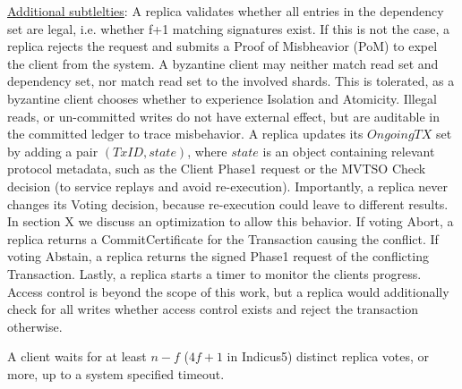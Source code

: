 \underline{Additional subtlelties}: A replica validates whether all entries in the dependency set are legal, i.e. whether f+1 matching signatures exist. If this is not the case, a replica rejects the request and submits a Proof of Misbheavior (PoM) to expel the client from the system. A byzantine client may neither match read set and dependency set, nor match read set to the involved shards. This is tolerated, as a byzantine client chooses whether to experience Isolation and Atomicity. Illegal reads, or un-committed writes do not have external effect, but are auditable in the committed ledger to trace misbehavior.
A replica updates its $OngoingTX$ set by adding a pair $(TxID, state)$, where $state$ is an object containing relevant protocol metadata, such as the Client Phase1 request or the MVTSO Check decision (to service replays and avoid re-execution). Importantly, a replica never changes its Voting decision, because re-execution could leave to different results. In section X we discuss an optimization to allow this behavior. If voting Abort, a replica returns a CommitCertificate for the Transaction causing the conflict. If voting Abstain, a replica returns the signed Phase1 request of the conflicting Transaction. 
Lastly, a replica starts a timer to monitor the clients progress.
Access control is beyond the scope of this work, but a replica would additionally check for all writes whether access control exists and reject the transaction otherwise.


A client waits for at least $n-f$ ($4f+1$ in Indicus5) distinct replica votes, or more, up to a system specified timeout. 

